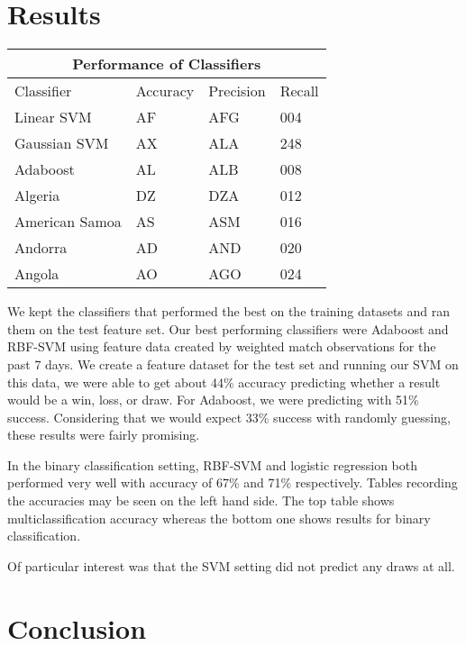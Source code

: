 \documentclass[paper=a4, fontsize=11pt]{scrartcl}
\numberwithin{equation}{section}		%
\numberwithin{figure}{section}			%
\numberwithin{table}{section}				%
\begin{document}
\section{Results}

\begin{tabular}{ |p{3cm}||p{3cm}|p{3cm}|p{3cm}|  }
 \hline
 \multicolumn{4}{|c|}{Performance of Classifiers} \\
 \hline
Classifier & Accuracy & Precision & Recall\\
 \hline
 Linear SVM   & AF    &AFG&   004\\
 Gaussian SVM &   AX  & ALA   &248\\
 Adaboost &AL & ALB&  008\\
 Algeria    &DZ & DZA&  012\\
 American Samoa&   AS  & ASM&016\\
 Andorra& AD  & AND   &020\\
 Angola& AO  & AGO&024\\
 \hline
\end{tabular}


We kept the classifiers that performed the best on the training datasets and ran them on the test feature set. Our best performing classifiers were Adaboost and RBF-SVM using feature data created by weighted match observations for the past 7 days.  We create a feature dataset for the test set and running our SVM on this data, we were able to get about 44\% accuracy predicting whether a result would be a win, loss, or draw. For Adaboost, we were predicting with 51\% success. Considering that we would expect 33\% success with randomly guessing, these results were fairly promising.

In the binary classification setting, RBF-SVM and logistic regression both performed very well with accuracy of 67\% and 71\% respectively. Tables recording the accuracies may be seen on the left hand side. The top table shows multiclassification accuracy whereas the bottom one shows results for binary classification.

Of particular interest was that the SVM setting did not predict any draws at all.

\section{Conclusion}

\end{document}
